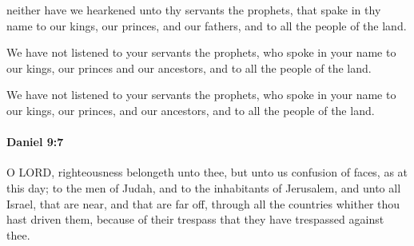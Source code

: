 			\begin{versebox}
					\item[BHS] 
					\item[LXX] 
					\item[ASV] neither have we hearkened unto thy servants the prophets, that spake in thy name to our kings, our princes, and our fathers, and to all the people of the land.
					\item[NIV] We have not listened to your servants the prophets, who spoke in your name to our kings, our princes and our ancestors, and to all the people of the land.
					\item[NRSV] We have not listened to your servants the prophets, who spoke in your name to our kings, our princes, and our ancestors, and to all the people of the land.
			\end{versebox}

		\paragraph{Daniel 9:7} %
			\label{DANIEL-9-7}

			O LORD, righteousness belongeth unto thee, but unto us confusion of faces, as at this day; to the men of Judah, and to the inhabitants of Jerusalem, and unto all Israel, that are near, and that are far off, through all the countries whither thou hast driven them, because of their trespass that they have trespassed against thee.

